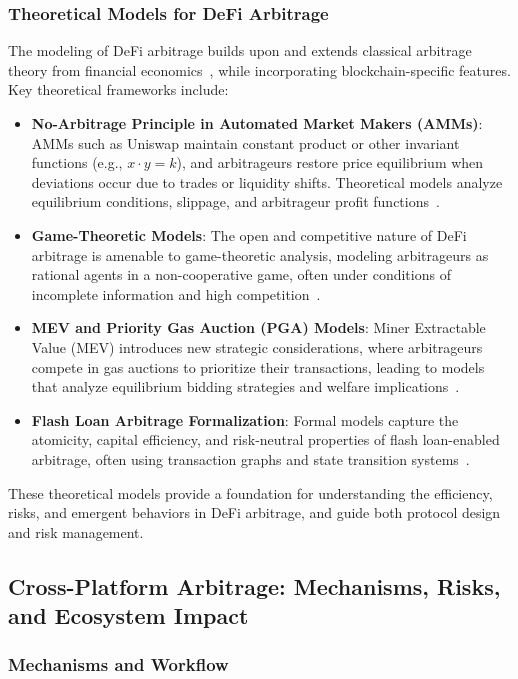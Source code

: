 \documentclass[conference]{IEEEtran}
\begin{document}
\subsubsection{Theoretical Models for DeFi Arbitrage}
The modeling of DeFi arbitrage builds upon and extends classical arbitrage theory from financial economics~\cite{shleifer1997limits}, while incorporating blockchain-specific features. Key theoretical frameworks include:
\begin{itemize}
    \item \textbf{No-Arbitrage Principle in Automated Market Makers (AMMs)}: AMMs such as Uniswap maintain constant product or other invariant functions (e.g., $x \cdot y = k$), and arbitrageurs restore price equilibrium when deviations occur due to trades or liquidity shifts. Theoretical models analyze equilibrium conditions, slippage, and arbitrageur profit functions~\cite{angeris2020improved}.
    \item \textbf{Game-Theoretic Models}: The open and competitive nature of DeFi arbitrage is amenable to game-theoretic analysis, modeling arbitrageurs as rational agents in a non-cooperative game, often under conditions of incomplete information and high competition~\cite{qin2022quantifying}.
    \item \textbf{MEV and Priority Gas Auction (PGA) Models}: Miner Extractable Value (MEV) introduces new strategic considerations, where arbitrageurs compete in gas auctions to prioritize their transactions, leading to models that analyze equilibrium bidding strategies and welfare implications~\cite{daian2020flash}.
    \item \textbf{Flash Loan Arbitrage Formalization}: Formal models capture the atomicity, capital efficiency, and risk-neutral properties of flash loan-enabled arbitrage, often using transaction graphs and state transition systems~\cite{qin2021attacking}.
\end{itemize}
These theoretical models provide a foundation for understanding the efficiency, risks, and emergent behaviors in DeFi arbitrage, and guide both protocol design and risk management.
\subsection{Cross-Platform Arbitrage: Mechanisms, Risks, and Ecosystem Impact}
    \subsubsection{Mechanisms and Workflow}
\end{document}
